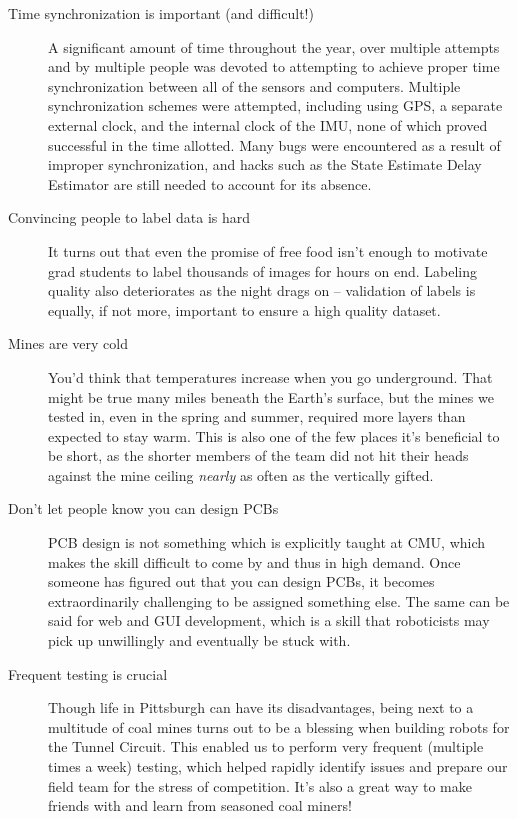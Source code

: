 \begin{description}
	\item[Time synchronization is important (and difficult!)] A significant amount of time throughout the year, over multiple attempts and by multiple people was devoted to attempting to achieve proper time synchronization between all of the sensors and computers. Multiple synchronization schemes were attempted, including using GPS, a separate external clock, and the internal clock of the IMU, none of which proved successful in the time allotted. Many bugs were encountered as a result of improper synchronization, and hacks such as the State Estimate Delay Estimator are still needed to account for its absence.
	\item[Convincing people to label data is hard] It turns out that even the promise of free food isn't enough to motivate grad students to label thousands of images for hours on end. Labeling quality also deteriorates as the night drags on -- validation of labels is equally, if not more, important to ensure a high quality dataset.
	\item[Mines are very cold] You'd think that temperatures increase when you go underground. That might be true many miles beneath the Earth's surface, but the mines we tested in, even in the spring and summer, required more layers than expected to stay warm. This is also one of the few places it's beneficial to be short, as the shorter members of the team did not hit their heads against the mine ceiling \textit{nearly} as often as the vertically gifted.
	\item[Don't let people know you can design PCBs] PCB design is not something which is explicitly taught at CMU, which makes the skill difficult to come by and thus in high demand. Once someone has figured out that you can design PCBs, it becomes extraordinarily challenging to be assigned something else. The same can be said for web and GUI development, which is a skill that roboticists may pick up unwillingly and eventually be stuck with.
	\item[Frequent testing is crucial] Though life in Pittsburgh can have its disadvantages, being next to a multitude of coal mines turns out to be a blessing when building robots for the Tunnel Circuit. This enabled us to perform very frequent (multiple times a week) testing, which helped rapidly identify issues and prepare our field team for the stress of competition. It's also a great way to make friends with and learn from seasoned coal miners!
\end{description}